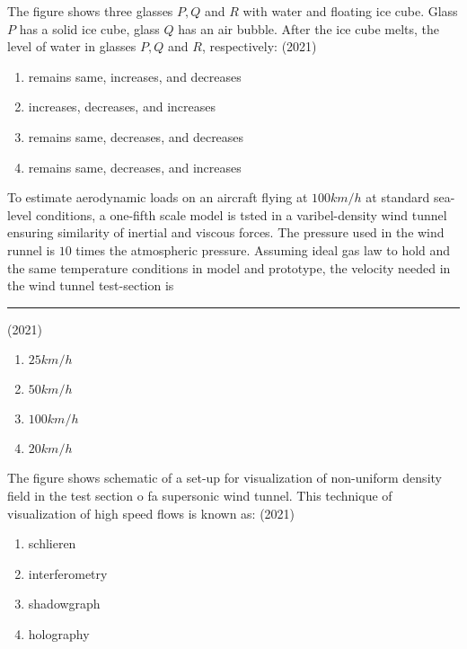 \iffalse
\chapter{2021}
\author{AI24BTECH11004}
\section{ae}
\fi
       \item The figure shows three glasses $P,Q$ and $R$ with water and floating ice cube. Glass $P$ has a solid ice cube, glass $Q$ has an air bubble. After the ice cube melts, the level of water in glasses $P,Q$ and $R$, respectively:
       \hfill{(2021)}
     
       \begin{enumerate}
           \item remains same, increases, and decreases
           \item increases, decreases, and increases
           \item remains same, decreases, and decreases
           \item remains same, decreases, and increases
       \end{enumerate}
       \item To estimate aerodynamic loads on an aircraft flying at $100km/h$ at standard sea-level conditions, a one-fifth scale model is tsted in a varibel-density wind tunnel ensuring similarity of inertial and viscous forces. The pressure used in the wind runnel is $10$ times the atmospheric pressure. Assuming ideal gas law to hold and the same temperature conditions in model and prototype, the velocity needed in the wind tunnel test-section is \rule{1cm}{0.15mm}
       \hfill{(2021)}
       \begin{enumerate}
           \item $25km/h$
           \item $50km/h$
           \item $100km/h$
           \item $20km/h$
       \end{enumerate}
       \item The figure shows schematic of a set-up for visualization of non-uniform density field in the test section o fa supersonic wind tunnel. This technique of visualization of high speed flows is known as: 
       \hfill{(2021)}
 
		\begin{enumerate}
           \item schlieren 
           \item interferometry
           \item shadowgraph
           \item holography
       \end{enumerate}
